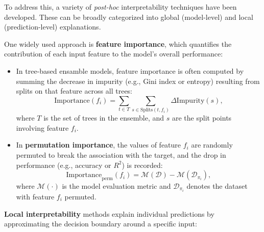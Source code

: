To address this, a variety of \emph{post-hoc} interpretability techniques have
been developed. These can be broadly categorized into global (model-level) and
local (prediction-level) explanations.

One widely used approach is \textbf{feature importance}, which quantifies the
contribution of each input feature to the model's overall performance:

\begin{itemize}
    \item In tree-based ensamble models, feature importance is often computed by summing the
          decrease in impurity (e.g., Gini index or entropy) resulting from splits on
          that feature across all trees: \begin{equation} \text{Importance}(f_i) =
              \sum_{t \in T} \sum_{s \in \text{Splits}(t, f_i)} \Delta \text{Impurity}(s),
          \end{equation}
          where $T$ is the set of trees in the ensemble, and $s$ are the split points
          involving feature $f_i$.

    \item In \textbf{permutation importance}, the values of feature $f_i$ are randomly
          permuted to break the association with the target, and the drop in performance
          (e.g., accuracy or $R^2$) is recorded:
          \begin{equation} \text{Importance}_{\text{perm}}(f_i) =
              \mathcal{M}(\mathcal{D}) - \mathcal{M}(\mathcal{D}_{\pi_i}),
          \end{equation}
          where $\mathcal{M}(\cdot)$ is the model evaluation metric and
          $\mathcal{D}_{\pi_i}$ denotes the dataset with feature $f_i$ permuted.
\end{itemize}

\textbf{Local interpretability} methods explain individual predictions by approximating
the decision boundary around a specific input:

